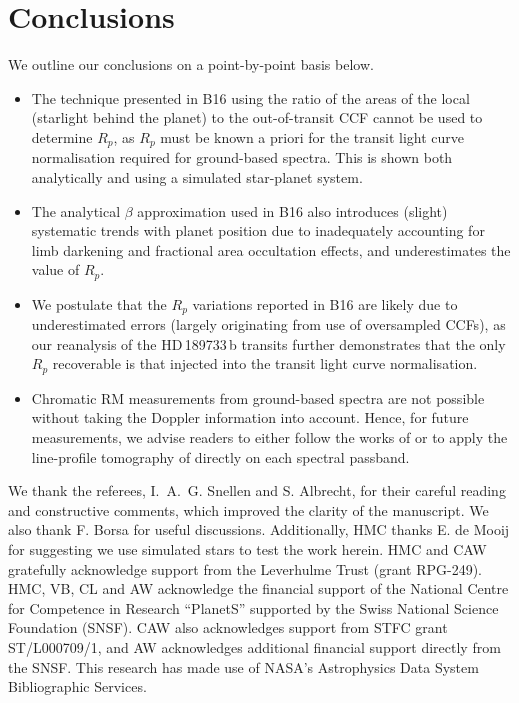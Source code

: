 \documentclass{aa}
\begin{document}
\vspace{-10pt}
\section{Conclusions}
\label{sec:conc}
We outline our conclusions on a point-by-point basis below. 

\begin{itemize}

\item The technique presented in B16 using the ratio of the areas of the local (starlight behind the planet) to the out-of-transit CCF cannot be used to determine $R_p$, as $R_p$ must be known a priori for the transit light curve normalisation required for ground-based spectra. This is shown both analytically and using a simulated star-planet system.

\item The analytical $\beta$ approximation used in B16 also introduces (slight) systematic trends with planet position due to inadequately accounting for limb darkening and fractional area occultation effects, and underestimates the value of $R_p$. 

\item We postulate that the $R_p$ variations reported in B16 are likely due to underestimated errors (largely originating from use of oversampled CCFs), as our reanalysis of the HD\,189733\,b transits further demonstrates that the only $R_p$ recoverable is that injected into the transit light curve normalisation. 

\item Chromatic RM measurements from ground-based spectra are not possible without taking the Doppler information into account. Hence, for future measurements, we advise readers to either follow the works of \cite{snellen04, digloria15} or to apply the line-profile tomography of \cite{cameron10} directly on each spectral passband.

\end{itemize}


\begin{acknowledgements} 
We thank the referees, I.~A.~G. Snellen and S. Albrecht, for their careful reading and constructive comments, which improved the clarity of the manuscript. We also thank F. Borsa for useful discussions. Additionally, HMC thanks E. de Mooij for suggesting we use simulated stars to test the work herein. HMC and CAW gratefully acknowledge support from the Leverhulme Trust (grant RPG-249). HMC, VB, CL and AW acknowledge the financial support of the National Centre for Competence in Research ``PlanetS'' supported by the Swiss National Science Foundation (SNSF). CAW also acknowledges support from STFC grant ST/L000709/1, and AW acknowledges additional financial support directly from the SNSF. This research has made use of NASA's Astrophysics Data System Bibliographic Services.
\end{acknowledgements}



\end{document}
